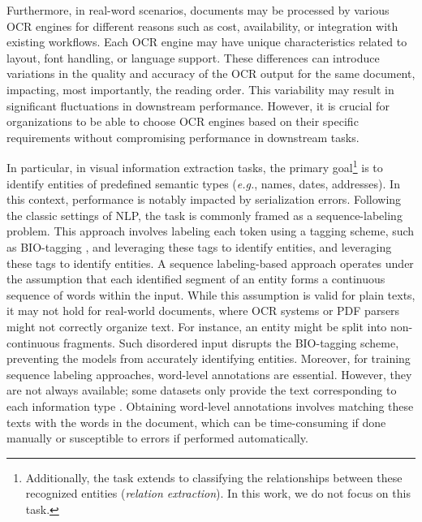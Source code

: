 Furthermore, in real-word scenarios, documents may be processed by various \ac{OCR} engines for different reasons such as cost, availability, or integration with existing workflows. Each \ac{OCR} engine may have unique characteristics related to layout, font handling, or language support. These differences can introduce variations in the quality and accuracy of the \ac{OCR} output for the same document, impacting, most importantly, the reading order. This variability may result in significant fluctuations in downstream performance. However, it is crucial for organizations to be able to choose \ac{OCR} engines based on their specific requirements without compromising performance in downstream tasks.


In particular, in visual information extraction tasks, the primary goal\footnote{Additionally, the task extends to classifying the relationships between these recognized entities (\textit{relation extraction}). In this work, we do not focus on this task.} is to identify entities of predefined semantic types (\textit{e.g.}, names, dates, addresses). In this context, performance is notably impacted by serialization errors. Following the classic settings of \ac{NLP}, the task is commonly framed as a sequence-labeling problem. This approach involves labeling each token using a tagging scheme, such as BIO-tagging \citep{ramshaw1999text}, and leveraging these tags to identify entities, and leveraging these tags to identify entities. A sequence labeling-based approach operates under the assumption that each identified segment of an entity forms a continuous sequence of words within the input. While this assumption is valid for plain texts, it may not hold for real-world documents, where \ac{OCR} systems or PDF parsers might not correctly organize text. For instance, an entity might be split into non-continuous fragments. Such disordered input disrupts the BIO-tagging scheme, preventing the models from accurately identifying entities. Moreover, for training sequence labeling approaches, word-level annotations are essential. However, they are not always available; some datasets only provide the text corresponding to each information type \citep{gralinski2020kleister}. Obtaining word-level annotations involves matching these texts with the words in the document, which can be time-consuming if done manually or susceptible to errors if performed automatically.

